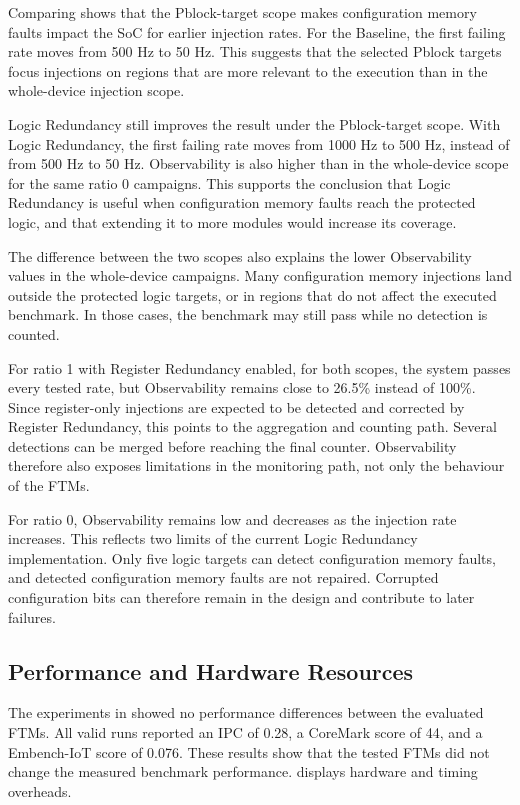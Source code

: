 Comparing  shows that the Pblock-target scope makes configuration memory faults impact the \ac{SoC} for earlier injection rates. For the Baseline, the first failing rate moves from 500 Hz to 50 Hz. This suggests that the selected Pblock targets focus injections on regions that are more relevant to the execution than in the whole-device injection scope.

Logic Redundancy still improves the result under the Pblock-target scope. With Logic Redundancy, the first failing rate moves from 1000 Hz to 500 Hz, instead of from 500 Hz to 50 Hz. Observability is also higher than in the whole-device scope for the same ratio 0 campaigns. This supports the conclusion that Logic Redundancy is useful when configuration memory faults reach the protected logic, and that extending it to more modules would increase its coverage.

The difference between the two scopes also explains the lower Observability values in the whole-device campaigns. Many configuration memory injections land outside the protected logic targets, or in regions that do not affect the executed benchmark. In those cases, the benchmark may still pass while no detection is counted.

For ratio 1 with Register Redundancy enabled, for both scopes, the system passes every tested rate, but Observability remains close to 26.5\% instead of 100\%. Since register-only injections are expected to be detected and corrected by Register Redundancy, this points to the aggregation and counting path. Several detections can be merged before reaching the final counter. Observability therefore also exposes limitations in the monitoring path, not only the behaviour of the \acp{FTM}.

For ratio 0, Observability remains low and decreases as the injection rate increases. This reflects two limits of the current Logic Redundancy implementation. Only five logic targets can detect configuration memory faults, and detected configuration memory faults are not repaired. Corrupted configuration bits can therefore remain in the design and contribute to later failures.



\subsection{Performance and Hardware Resources}

The experiments in  showed no performance differences between the evaluated \acp{FTM}. All valid runs reported an \ac{IPC} of 0.28, a CoreMark score of 44, and a Embench-IoT score of 0.076. These results show that the tested \acp{FTM} did not change the measured benchmark performance.  displays hardware and timing overheads.

